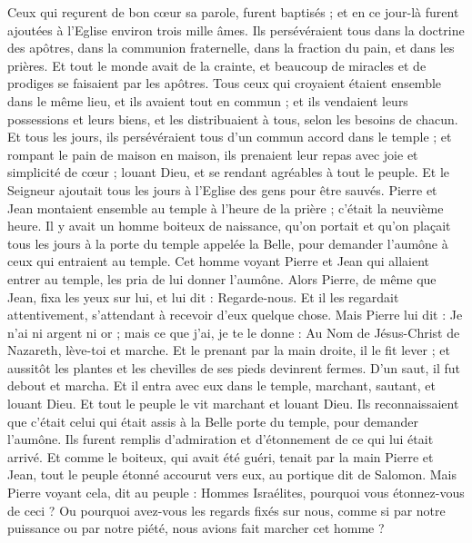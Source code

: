 \begin{multicols}{2}
Ceux qui reçurent de bon cœur sa parole, furent baptisés ; et en ce jour-là furent ajoutées à l'Eglise environ trois mille âmes.
Ils persévéraient tous dans la doctrine des apôtres, dans la communion fraternelle, dans la fraction du pain, et dans les prières.
Et tout le monde avait de la crainte, et beaucoup de miracles et de prodiges se faisaient par les apôtres.
Tous ceux qui croyaient étaient ensemble dans le même lieu, et ils avaient tout en commun ;
et ils vendaient leurs possessions et leurs biens, et les distribuaient à tous, selon les besoins de chacun.
Et tous les jours, ils persévéraient tous d'un commun accord dans le temple ; et rompant le pain de maison en maison, ils prenaient leur repas avec joie et simplicité de cœur ;
louant Dieu, et se rendant agréables à tout le peuple. Et le Seigneur ajoutait tous les jours à l'Eglise des gens pour être sauvés.
\VerseOne{}Pierre et Jean montaient ensemble au temple à l'heure de la prière ; c’était la neuvième heure.
Il y avait un homme boiteux de naissance, qu’on portait et qu’on plaçait tous les jours à la porte du temple appelée la Belle, pour demander l'aumône à ceux qui entraient au temple.
Cet homme voyant Pierre et Jean qui allaient entrer au temple, les pria de lui donner l'aumône.
Alors Pierre, de même que Jean, fixa les yeux sur lui, et lui dit : Regarde-nous.
Et il les regardait attentivement, s'attendant à recevoir d'eux quelque chose.
Mais Pierre lui dit : Je n'ai ni argent ni or ; mais ce que j'ai, je te le donne : Au Nom de Jésus-Christ de Nazareth, lève-toi et marche.
Et le prenant par la main droite, il le fit lever ; et aussitôt les plantes et les chevilles de ses pieds devinrent fermes.
D’un saut, il fut debout et marcha. Et il entra avec eux dans le temple, marchant, sautant, et louant Dieu.
Et tout le peuple le vit marchant et louant Dieu.
Ils reconnaissaient que c'était celui qui était assis à la Belle porte du temple, pour demander l'aumône. Ils furent remplis d'admiration et d'étonnement de ce qui lui était arrivé.
Et comme le boiteux, qui avait été guéri, tenait par la main Pierre et Jean, tout le peuple étonné accourut vers eux, au portique dit de Salomon.
Mais Pierre voyant cela, dit au peuple : Hommes Israélites, pourquoi vous étonnez-vous de ceci ? Ou pourquoi avez-vous les regards fixés sur nous, comme si par notre puissance ou par notre piété, nous avions fait marcher cet homme ?

\end{multicols}
